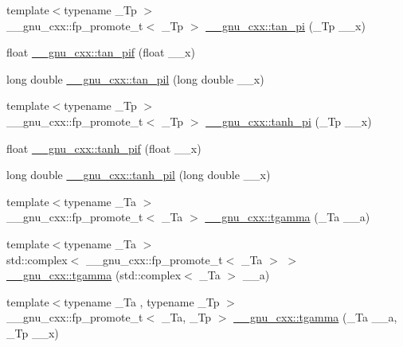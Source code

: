 \begin{DoxyCompactItemize}
{\footnotesize template$<$typename \+\_\+\+Tp $>$ }\\\+\_\+\+\_\+gnu\+\_\+cxx\+::fp\+\_\+promote\+\_\+t$<$ \+\_\+\+Tp $>$ \hyperlink{group__gnu__math__spec__func_ga12855bd62fe6a955ef0d1d5e92c85ba9}{\+\_\+\+\_\+gnu\+\_\+cxx\+::tan\+\_\+pi} (\+\_\+\+Tp \+\_\+\+\_\+x)
\item 
float \hyperlink{group__gnu__math__spec__func_gaab32e2d76da811451e84232320ddf80c}{\+\_\+\+\_\+gnu\+\_\+cxx\+::tan\+\_\+pif} (float \+\_\+\+\_\+x)
\item 
long double \hyperlink{group__gnu__math__spec__func_ga3546906a5bb8f128c893dddef72e2f20}{\+\_\+\+\_\+gnu\+\_\+cxx\+::tan\+\_\+pil} (long double \+\_\+\+\_\+x)
\item 
{\footnotesize template$<$typename \+\_\+\+Tp $>$ }\\\+\_\+\+\_\+gnu\+\_\+cxx\+::fp\+\_\+promote\+\_\+t$<$ \+\_\+\+Tp $>$ \hyperlink{group__gnu__math__spec__func_ga8729ffd5acf3266315e9dac1b5a9b3a6}{\+\_\+\+\_\+gnu\+\_\+cxx\+::tanh\+\_\+pi} (\+\_\+\+Tp \+\_\+\+\_\+x)
\item 
float \hyperlink{group__gnu__math__spec__func_gab6cbfb582127f997ad9a198903d08889}{\+\_\+\+\_\+gnu\+\_\+cxx\+::tanh\+\_\+pif} (float \+\_\+\+\_\+x)
\item 
long double \hyperlink{group__gnu__math__spec__func_ga4bc71ee5cf3df2ba35e6504027e5c6c6}{\+\_\+\+\_\+gnu\+\_\+cxx\+::tanh\+\_\+pil} (long double \+\_\+\+\_\+x)
\item 
{\footnotesize template$<$typename \+\_\+\+Ta $>$ }\\\+\_\+\+\_\+gnu\+\_\+cxx\+::fp\+\_\+promote\+\_\+t$<$ \+\_\+\+Ta $>$ \hyperlink{group__gnu__math__spec__func_ga73a634663e4eceb1e6bcf3fc16773b7b}{\+\_\+\+\_\+gnu\+\_\+cxx\+::tgamma} (\+\_\+\+Ta \+\_\+\+\_\+a)
\item 
{\footnotesize template$<$typename \+\_\+\+Ta $>$ }\\std\+::complex$<$ \+\_\+\+\_\+gnu\+\_\+cxx\+::fp\+\_\+promote\+\_\+t$<$ \+\_\+\+Ta $>$ $>$ \hyperlink{group__gnu__math__spec__func_gab01fe5b7f1bacdafcad5746ef50af777}{\+\_\+\+\_\+gnu\+\_\+cxx\+::tgamma} (std\+::complex$<$ \+\_\+\+Ta $>$ \+\_\+\+\_\+a)
\item 
{\footnotesize template$<$typename \+\_\+\+Ta , typename \+\_\+\+Tp $>$ }\\\+\_\+\+\_\+gnu\+\_\+cxx\+::fp\+\_\+promote\+\_\+t$<$ \+\_\+\+Ta, \+\_\+\+Tp $>$ \hyperlink{group__gnu__math__spec__func_ga264207c0040cd3877fad455121da8518}{\+\_\+\+\_\+gnu\+\_\+cxx\+::tgamma} (\+\_\+\+Ta \+\_\+\+\_\+a, \+\_\+\+Tp \+\_\+\+\_\+x)

\end{DoxyCompactItemize}
